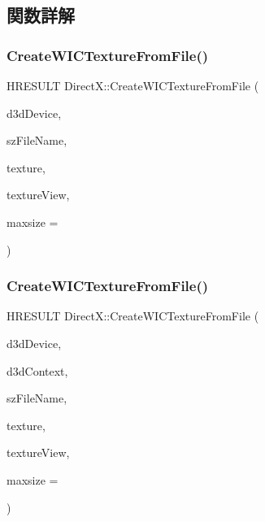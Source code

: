 \subsection{関数詳解}
\mbox{\label{namespace_direct_x_a5fdba9031952424bfe7d31e0d859edd2}} 
\subsubsection{\texorpdfstring{Create\+W\+I\+C\+Texture\+From\+File()}{CreateWICTextureFromFile()}\hspace{0.1cm}{\footnotesize\ttfamily [1/2]}}
{\footnotesize\ttfamily H\+R\+E\+S\+U\+LT Direct\+X\+::\+Create\+W\+I\+C\+Texture\+From\+File (\begin{DoxyParamCaption}\item[{\+\_\+\+In\+\_\+ I\+D3\+D11\+Device $\ast$}]{d3d\+Device,  }\item[{\+\_\+\+In\+\_\+z\+\_\+ const wchar\+\_\+t $\ast$}]{sz\+File\+Name,  }\item[{\+\_\+\+Outptr\+\_\+opt\+\_\+ I\+D3\+D11\+Resource $\ast$$\ast$}]{texture,  }\item[{\+\_\+\+Outptr\+\_\+opt\+\_\+ I\+D3\+D11\+Shader\+Resource\+View $\ast$$\ast$}]{texture\+View,  }\item[{\+\_\+\+In\+\_\+ size\+\_\+t}]{maxsize = {} }\end{DoxyParamCaption})}

\mbox{\label{namespace_direct_x_a8907d700dcbb64e9a172ac986ade4877}} 
\subsubsection{\texorpdfstring{Create\+W\+I\+C\+Texture\+From\+File()}{CreateWICTextureFromFile()}\hspace{0.1cm}{\footnotesize\ttfamily [2/2]}}
{\footnotesize\ttfamily H\+R\+E\+S\+U\+LT Direct\+X\+::\+Create\+W\+I\+C\+Texture\+From\+File (\begin{DoxyParamCaption}\item[{\+\_\+\+In\+\_\+ I\+D3\+D11\+Device $\ast$}]{d3d\+Device,  }\item[{\+\_\+\+In\+\_\+opt\+\_\+ I\+D3\+D11\+Device\+Context $\ast$}]{d3d\+Context,  }\item[{\+\_\+\+In\+\_\+z\+\_\+ const wchar\+\_\+t $\ast$}]{sz\+File\+Name,  }\item[{\+\_\+\+Outptr\+\_\+opt\+\_\+ I\+D3\+D11\+Resource $\ast$$\ast$}]{texture,  }\item[{\+\_\+\+Outptr\+\_\+opt\+\_\+ I\+D3\+D11\+Shader\+Resource\+View $\ast$$\ast$}]{texture\+View,  }\item[{\+\_\+\+In\+\_\+ size\+\_\+t}]{maxsize = {} }\end{DoxyParamCaption})}


